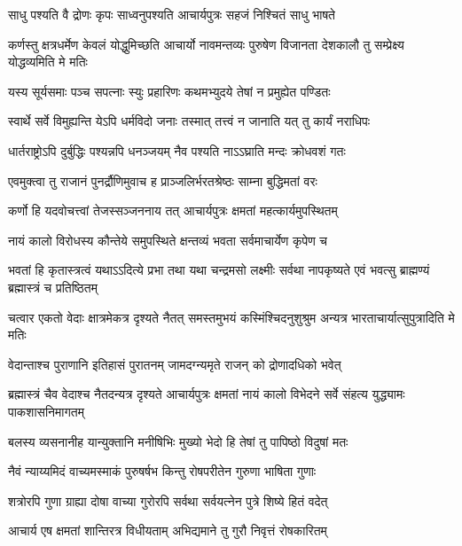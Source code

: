 \twolineshloka
{साधु पश्यति वै द्रोणः कृपः साध्वनुपश्यति}
{आचार्यपुत्रः सहजं निश्चितं साधु भाषते}


\threelineshloka
{कर्णस्तु क्षत्रधर्मेण केवलं योद्धुमिच्छति}
{आचार्यो नावमन्तव्यः पुरुषेण विजानता}
{देशकालौ तु सम्प्रेक्ष्य योद्धव्यमिति मे मतिः}


\twolineshloka
{यस्य सूर्यसमाः पञ्च सपत्नाः स्युः प्रहारिणः}
{कथमभ्युदये तेषां न प्रमुह्येत पण्डितः}


\twolineshloka
{स्वार्थे सर्वे विमुह्यन्ति येऽपि धर्मविदो जनाः}
{तस्मात् तत्त्वं न जानाति यत् तु कार्यं नराधिपः}


\twolineshloka
{धार्तराष्ट्रोऽपि दुर्बुद्धिः पश्यन्नपि धनञ्जयम्}
{नैव पश्यति नाऽऽघ्राति मन्दः क्रोधवशं गतः}



\twolineshloka
{एवमुक्त्वा तु राजानं पुनर्द्रौणिमुवाच ह}
{प्राञ्जलिर्भरतश्रेष्ठः साम्ना बुद्धिमतां वरः}


\twolineshloka
{कर्णो हि यदवोचत्त्वां तेजस्सञ्जननाय तत्}
{आचार्यपुत्रः क्षमतां महत्कार्यमुपस्थितम्}


\twolineshloka
{नायं कालो विरोधस्य कौन्तेये समुपस्थिते}
{क्षन्तव्यं भवता सर्वमाचार्येण कृपेण च}


\threelineshloka
{भवतां हि कृतास्त्रत्वं यथाऽऽदित्ये प्रभा तथा}
{यथा चन्द्रमसो लक्ष्मीः सर्वथा नापकृष्यते}
{एवं भवत्सु ब्राह्मण्यं ब्रह्मास्त्रं च प्रतिष्ठितम्}


\threelineshloka
{चत्वार एकतो वेदाः क्षात्रमेकत्र दृश्यते}
{नैतत् समस्तमुभयं कस्मिंश्चिदनुशुश्रुम}
{अन्यत्र भारताचार्यात्सुपुत्रादिति मे मतिः}


\twolineshloka
{वेदान्ताश्च पुराणानि इतिहासं पुरातनम्}
{जामदग्न्यमृते राजन् को द्रोणादधिको भवेत्}


\onelineshloka
{ब्रह्मास्त्रं चैव वेदाश्च नैतदन्यत्र दृश्यते}
\twolineshloka
{आचार्यपुत्रः क्षमतां नायं कालो विभेदने}
{सर्वे संहत्य युद्ध्यामः पाकशासनिमागतम्}


\twolineshloka
{बलस्य व्यसनानीह यान्युक्तानि मनीषिभिः}
{मुख्यो भेदो हि तेषां तु पापिष्ठो विदुषां मतः}




\twolineshloka
{नैवं न्याय्यमिदं वाच्यमस्माकं पुरुषर्षभ}
{किन्तु रोषपरीतेन गुरुणा भाषिता गुणाः}


\twolineshloka
{शत्रोरपि गुणा ग्राह्या दोषा वाच्या गुरोरपि}
{सर्वथा सर्वयत्नेन पुत्रे शिष्ये हितं वदेत्}


\twolineshloka
{आचार्य एष क्षमतां शान्तिरत्र विधीयताम्}
{अभिद्यमाने तु गुरौ निवृत्तं रोषकारितम्}


